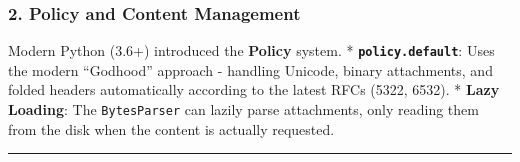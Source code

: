 \hypertarget{policy-and-content-management}{%
\subsubsection{2. Policy and Content
Management}\label{policy-and-content-management}}

Modern Python (3.6+) introduced the \textbf{Policy} system. *
\textbf{\passthrough{\lstinline!policy.default!}}: Uses the modern
``Godhood'' approach - handling Unicode, binary attachments, and folded
headers automatically according to the latest RFCs (5322, 6532). *
\textbf{Lazy Loading}: The \passthrough{\lstinline!BytesParser!} can
lazily parse attachments, only reading them from the disk when the
content is actually requested.

\begin{center}\rule{0.5\linewidth}{0.5pt}\end{center}
